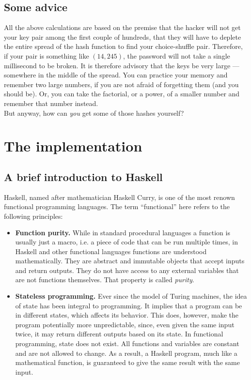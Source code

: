 \documentclass[12pt, a4paper]{article}
\begin{document}
\subsection{Some advice}

All the above calculations are based on the premise that the hacker will not get your key pair among the first couple of hundreds, that they will have to deplete the entire spread of the hash function to find your choice-shuffle pair. Therefore, if your pair is something like $ (14, 245) $, the password will not take a single millisecond to be broken. It is therefore advisory that the keys be very large --- somewhere in the middle of the spread. You can practice your memory and remember two large numbers, if you are not afraid of forgetting them (and you should be). Or, you can take the factorial, or a power, of a smaller number and remember that number instead.\\

But anyway, how can \emph{you} get some of those hashes yourself?

\section{The implementation}

\subsection{A brief introduction to Haskell}

Haskell, named after mathematician Haskell Curry, is one of the most renown functional programming languages. The term ``functional'' here refers to the following principles:

\begin{itemize}
    \item \textbf{Function purity.} While in standard procedural languages a function is usually just a macro, i.e. a piece of code that can be run multiple times, in Haskell and other functional languages functions are understood mathematically. They are abstract and immutable objects that accept inputs and return outputs. They do not have access to any external variables that are not functions themselves. That property is called \emph{purity}.
    \item \textbf{Stateless programming.} Ever since the model of Turing machines, the idea of state has been integral to programming. It implies that a program can be in different states, which affects its behavior. This does, however, make the program potentially more unpredictable, since, even given the same input twice, it may return different outputs based on its state. In functional programming, state does not exist. All functions and variables are constant and are not allowed to change. As a result, a Haskell program, much like a mathematical function, is guaranteed to give the same result with the same input.
\end{itemize}
\end{document}
